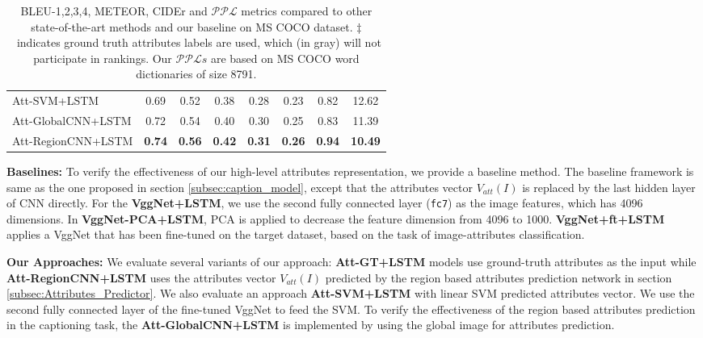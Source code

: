 \documentclass[10pt,journal,compsoc]{IEEEtran}
\def\Att{{V_{att}}}
\begin{document}
\begin{table}[t]
\begin{center}
{\begin{tabular}{ l c c c c c c|c}
Att-SVM+LSTM & 0.69 & 0.52 & 0.38  &0.28 & 0.23& 0.82&12.62  \\
Att-GlobalCNN+LSTM & 0.72  & 0.54  & 0.40   &0.30  & 0.25 & 0.83 &11.39    \\
    Att-RegionCNN+LSTM & \textbf{0.74} & \textbf{0.56} & \textbf{0.42}  & \textbf{0.31} & \textbf{0.26}& \textbf{0.94}& \textbf{10.49} \\ \hline
\end{tabular}}
      \vspace{-4pt}
      \caption{BLEU-1,2,3,4, METEOR, CIDEr and $\mathcal{PPL}$ metrics compared to other state-of-the-art methods and our baseline on MS COCO dataset. $\ddagger$~indicates ground truth attributes labels are used, which (in \colorbox[rgb]{0.7,0.7,0.7}{gray}) will not participate in rankings. Our $\mathcal{PPL}s$ are based on MS COCO word dictionaries of size 8791.}
      \label{tab2}
      \vspace{-25pt}
\end{center}
\end{table}

\vspace{3pt}
\noindent\textbf{Baselines:}
To verify the effectiveness of our high-level attributes representation, we provide a baseline method. The baseline framework is same as the one proposed in section \ref{subsec:caption_model}, except that the attributes vector $\Att(I)$ is replaced by the last hidden layer of CNN directly. For the \textbf{VggNet+LSTM}, we use the second fully connected layer (\texttt{fc7}) as the image features, which has 4096 dimensions. In \textbf{VggNet-PCA+LSTM}, PCA is applied to decrease the feature dimension from 4096 to 1000. \textbf{VggNet+ft+LSTM} applies a VggNet that has been fine-tuned on the target dataset, based on the task of image-attributes classification.

\vspace{3pt}
\noindent\textbf{Our Approaches:}
We evaluate several variants of our approach: \textbf{Att-GT+LSTM} models use ground-truth attributes as the input while \textbf{Att-RegionCNN+LSTM} uses the attributes vector $\Att(I)$ predicted by the region based attributes prediction network in section \ref{subsec:Attributes_Predictor}. We also evaluate an approach \textbf{Att-SVM+LSTM} with linear SVM predicted attributes vector. We use the second fully connected layer of the fine-tuned VggNet to feed the SVM. To verify the effectiveness of the region based attributes prediction in the captioning task, the \textbf{Att-GlobalCNN+LSTM} is implemented by using the global image for attributes prediction.
\end{document}
